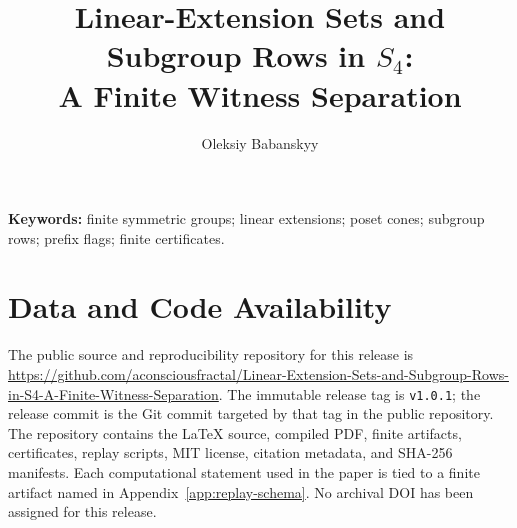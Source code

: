 \documentclass[11pt,a4paper]{article}
\title{Linear-Extension Sets and Subgroup Rows in \texorpdfstring{$S_4$}{S4}:\\ A Finite Witness Separation}
\author{Oleksiy Babanskyy}
\date{}
\begin{document}
\pagestyle{plain}
\maketitle

\begin{abstract}

\end{abstract}

\smallskip
\noindent\textbf{Keywords:} finite symmetric groups; linear extensions; poset cones; subgroup rows; prefix flags; finite certificates.












\appendix



\section*{Data and Code Availability}
The public source and reproducibility repository for this release is \url{https://github.com/aconsciousfractal/Linear-Extension-Sets-and-Subgroup-Rows-in-S4-A-Finite-Witness-Separation}. The immutable release tag is \texttt{v1.0.1}; the release commit is the Git commit targeted by that tag in the public repository. The repository contains the LaTeX source, compiled PDF, finite artifacts, certificates, replay scripts, MIT license, citation metadata, and SHA-256 manifests. Each computational statement used in the paper is tied to a finite artifact named in Appendix~\ref{app:replay-schema}. No archival DOI has been assigned for this release.



\end{document}
